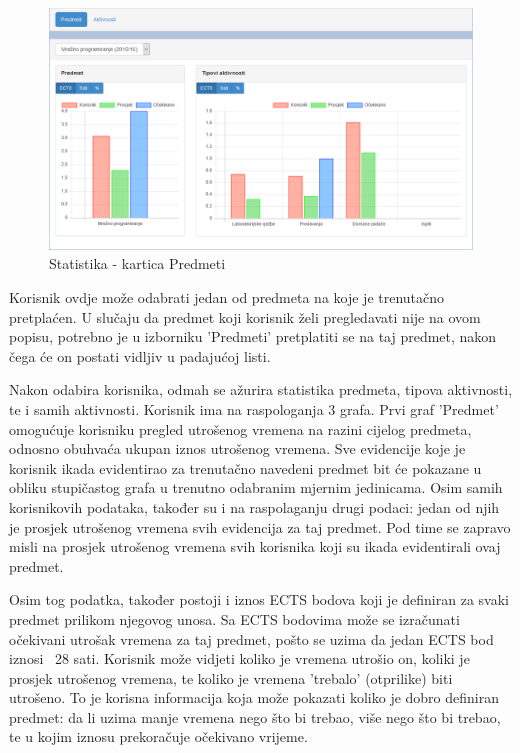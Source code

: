 \documentclass[times, utf8, zavrsni, numeric]{fer}
\begin{document}
\begin{figure}[H]
\centering
\includegraphics[width=\textwidth,height=\textheight,keepaspectratio]{img/statistika-web.png}
\caption{Statistika - kartica Predmeti}
\label{fig:statistika-web}
\end{figure}

Korisnik ovdje može odabrati jedan od predmeta na koje je trenutačno pretplaćen. U slučaju da predmet koji korisnik želi pregledavati nije na ovom popisu, potrebno je u izborniku 'Predmeti' pretplatiti se na taj predmet, nakon čega će on postati vidljiv u padajućoj listi.

Nakon odabira korisnika, odmah se ažurira statistika predmeta, tipova aktivnosti, te i samih aktivnosti. Korisnik ima na raspologanja 3 grafa. Prvi graf 'Predmet' omogućuje korisniku pregled utrošenog vremena na razini cijelog predmeta, odnosno obuhvaća ukupan iznos utrošenog vremena. Sve evidencije koje je korisnik ikada evidentirao za trenutačno navedeni predmet bit će pokazane u obliku stupičastog grafa u trenutno odabranim mjernim jedinicama. Osim samih korisnikovih podataka, također su i na raspolaganju drugi podaci: jedan od njih je prosjek utrošenog vremena svih evidencija za taj predmet. Pod time se zapravo misli na prosjek utrošenog vremena svih korisnika koji su ikada evidentirali ovaj predmet.

Osim tog podatka, također postoji i iznos ECTS bodova koji je definiran za svaki predmet prilikom njegovog unosa. Sa ECTS bodovima može se izračunati očekivani utrošak vremena za taj predmet, pošto se uzima da jedan ECTS bod iznosi ~28 sati. Korisnik može vidjeti koliko je vremena utrošio on, koliki je prosjek utrošenog vremena, te koliko je vremena 'trebalo' (otprilike) biti utrošeno. To je korisna informacija koja može pokazati koliko je dobro definiran predmet: da li uzima manje vremena nego što bi trebao, više nego što bi trebao, te u kojim iznosu prekoračuje očekivano vrijeme.
\end{document}
